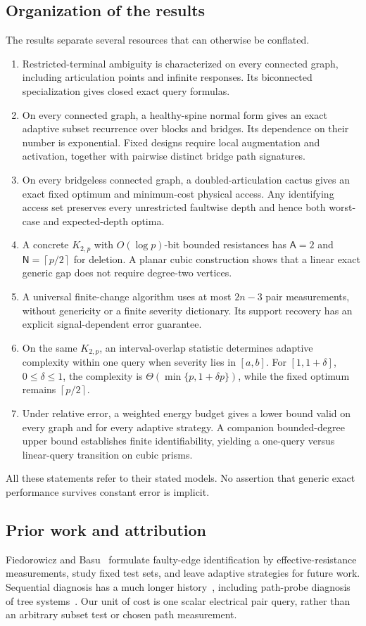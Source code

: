 \documentclass[11pt,letterpaper]{article}
\newcommand{\ceil}[1]{\left\lceil #1\right\rceil}
\newcommand{\A}{\mathsf A}
\newcommand{\N}{\mathsf N}
\begin{document}
\subsection{Organization of the results}
The results separate several resources that can otherwise be conflated.
\begin{enumerate}
\item Restricted-terminal ambiguity is characterized on every connected graph, including articulation points and infinite responses. Its biconnected specialization gives closed exact query formulas.
\item On every connected graph, a healthy-spine normal form gives an exact adaptive subset recurrence over blocks and bridges. Its dependence on their number is exponential. Fixed designs require local augmentation and activation, together with pairwise distinct bridge path signatures.
\item On every bridgeless connected graph, a doubled-articulation cactus gives an exact fixed optimum and minimum-cost physical access. Any identifying access set preserves every unrestricted faultwise depth and hence both worst-case and expected-depth optima.
\item A concrete $K_{2,p}$ with $O(\log p)$-bit bounded resistances has $\A=2$ and $\N=\ceil{p/2}$ for deletion. A planar cubic construction shows that a linear exact generic gap does not require degree-two vertices.
\item A universal finite-change algorithm uses at most $2n-3$ pair measurements, without genericity or a finite severity dictionary. Its support recovery has an explicit signal-dependent error guarantee.
\item On the same $K_{2,p}$, an interval-overlap statistic determines adaptive complexity within one query when severity lies in $[a,b]$. For $[1,1+\delta]$, $0\le\delta\le1$, the complexity is $\Theta(\min\{p,1+\delta p\})$, while the fixed optimum remains $\ceil{p/2}$.
\item Under relative error, a weighted energy budget gives a lower bound valid on every graph and for every adaptive strategy. A companion bounded-degree upper bound establishes finite identifiability, yielding a one-query versus linear-query transition on cubic prisms.
\end{enumerate}
All these statements refer to their stated models. No assertion that generic exact performance survives constant error is implicit.

\subsection{Prior work and attribution}
Fiedorowicz and Basu~\cite{FB} formulate faulty-edge identification by effective-resistance measurements, study fixed test sets, and leave adaptive strategies for future work. Sequential diagnosis has a much longer history~\cite{VHF}, including path-probe diagnosis of tree systems~\cite{IKT}. Our unit of cost is one scalar electrical pair query, rather than an arbitrary subset test or chosen path measurement.
\end{document}
